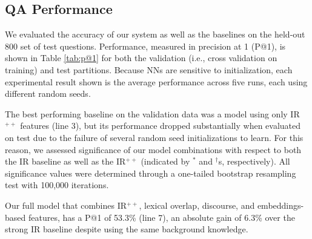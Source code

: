 \subsection{QA Performance}
\label{sec-emnlp2017:accuracy}
We evaluated the accuracy of our system as well as the baselines on the held-out 800 set of test questions.  Performance, measured in precision at 1 (P@1)\citep{manning08}, is shown in Table \ref{tab:p@1} for both the validation (i.e., cross validation on training) and test partitions.  Because NNs are sensitive to initialization, each experimental result shown is the average performance across five runs, each using different random seeds.   

The best performing baseline on the validation data was a model using only IR$^{++}$ features (line 3), but its performance dropped substantially when evaluated on test due to the failure of several random seed initializations to learn.  For this reason, we assessed significance of our model combinations with respect to both the IR baseline as well as the IR$^{++}$ (indicated by $^*$ and $^{\dagger}$s, respectively). All significance values were determined through a one-tailed bootstrap resampling test with 100,000 iterations.

Our full model that combines IR$^{++}$, lexical overlap, discourse, and embeddings-based features, has a P@1 of 53.3\% (line 7), an absolute gain of 6.3\% over the strong IR baseline despite using the same background knowledge.  

